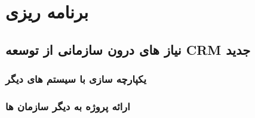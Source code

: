 \section{برنامه ریزی}


\subsection{نیاز های درون سازمانی از توسعه CRM جدید}
\subsubsection{یکپارچه سازی با سیستم های دیگر}
\subsubsection{ارائه پروژه به دیگر سازمان ها}
